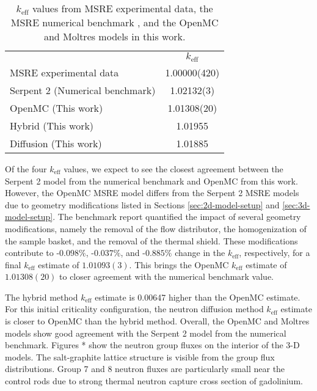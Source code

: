 \begin{table}[htb]
  \centering
  \caption{$k_\text{eff}$ values from \gls{MSRE} experimental data, the \gls{MSRE} numerical
  benchmark \cite{fratoni_molten_2020}, and the OpenMC and Moltres models in this work.}
  \begin{tabular}{l S[table-format=1.5(2)]}
    \toprule
     & {$k_\text{eff}$} \\
     \cmidrule(l){2-2}
    \gls{MSRE} experimental data & 1.00000(420) \\
    Serpent 2 (Numerical benchmark) & 1.02132(3) \\
    OpenMC (This work) & 1.01308(20) \\
    Hybrid (This work) & 1.01955 \\
    Diffusion (This work) & 1.01885 \\
    \bottomrule
  \end{tabular}
  \label{table:initial-crit}
\end{table}

Of the four $k_\text{eff}$ values, we expect to see the closest agreement between the Serpent 2
model from the numerical benchmark and OpenMC from this work. However, the OpenMC \gls{MSRE} model
differs from the Serpent 2 \gls{MSRE} models due to geometry modifications listed in Sections
\ref{sec:2d-model-setup} and \ref{sec:3d-model-setup}. The benchmark report quantified the impact
of several geometry modifications, namely the removal of the flow distributor, the homogenization
of the sample basket, and the removal of the thermal shield. These modifications contribute to
-$0.098\%$, -$0.037\%$, and -$0.885\%$ change in the $k_\text{eff}$, respectively, for a final
$k_\text{eff}$ estimate of $1.01093(3)$. This brings the OpenMC $k_\text{eff}$ estimate of
$1.01308(20)$ to closer agreement with the numerical benchmark value.

The hybrid method $k_\text{eff}$ estimate is 0.00647 higher than the OpenMC estimate. For this
initial criticality configuration, the neutron diffusion method $k_\text{eff}$ estimate is closer
to OpenMC than the hybrid method. Overall, the OpenMC and Moltres models show good agreement with
the Serpent 2 model from the numerical benchmark.
Figures * show the neutron group fluxes on the interior of the 3-D models. The salt-graphite
lattice structure is visible from the group flux distributions. Group 7 and 8 neutron fluxes are
particularly small near the control rods due to strong thermal neutron capture cross section of
gadolinium.

